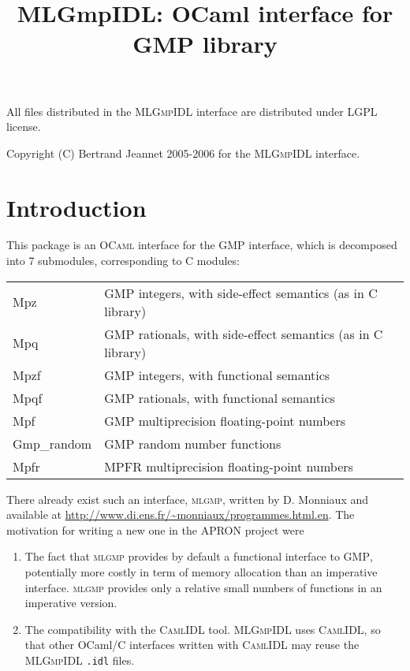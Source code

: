 \documentclass[[twoside,10pt,a4paper]{report}
\title{MLGmpIDL: OCaml interface for GMP library}
\begin{document}
\maketitle


\vspace*{0.9\textheight}

All files distributed in the \textsc{MLGmpIDL} interface are
distributed under LGPL license.

Copyright (C) Bertrand Jeannet 2005-2006 for the
\textsc{MLGmpIDL} interface.

\newpage

\section*{Introduction}

This package is an \textsc{OCaml} interface for the GMP
interface, which is decomposed into 7 submodules, corresponding to C
modules:

\noindent
\begin{tabular}{l@{~:~~}l}
Mpz        & GMP integers, with side-effect semantics (as in C library) \\
Mpq        & GMP rationals, with side-effect semantics (as in C library) \\
Mpzf       & GMP integers, with functional semantics  \\
Mpqf       & GMP rationals, with functional semantics \\
Mpf        & GMP multiprecision floating-point numbers \\
Gmp\_random & GMP random number functions \\
Mpfr      & MPFR multiprecision floating-point numbers
\end{tabular}

There already exist such an interface, \textsc{mlgmp}, written by
D. Monniaux and available at
\url{http://www.di.ens.fr/~monniaux/programmes.html.en}. The
motivation for writing a new one in the APRON project were
\begin{enumerate}
\item The fact that \textsc{mlgmp} provides by default a
  functional interface to \textsc{GMP}, potentially more costly in
  term of memory allocation than an imperative interface.
  \textsc{mlgmp} provides only a relative small numbers of
  functions in an imperative version.
\item The compatibility with the \textsc{CamlIDL} tool.
  \textsc{MLGmpIDL} uses \textsc{CamlIDL}, so that other OCaml/C
  interfaces written with \textsc{CamlIDL} may reuse the
  \textsc{MLGmpIDL} \texttt{.idl} files.
\end{enumerate}
\end{document}

